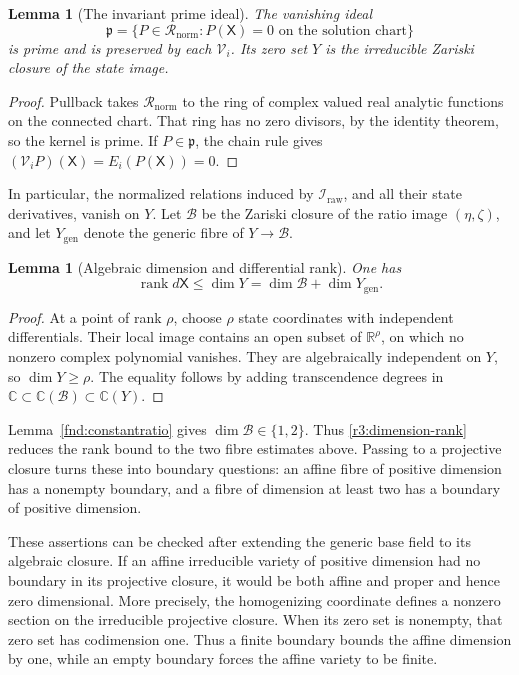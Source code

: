 \documentclass[11pt,a4paper]{article}
\numberwithin{equation}{section}
\theoremstyle{plain}
\newtheorem{lemma}[theorem]{Lemma}
\theoremstyle{definition}
\theoremstyle{remark}
\begin{document}
\begin{lemma}[The invariant prime ideal]\label{r3short:actual-prime}
The vanishing ideal
\[
 \mathfrak p=\{P\in\mathscr R_{\mathrm{norm}}:
       P(\mathsf X)=0\text{ on the solution chart}\}
\]
is prime and is preserved by each $\mathcal V_i$. Its zero set $Y$ is
the irreducible Zariski closure of the state image.
\end{lemma}
\begin{proof}
Pullback takes $\mathscr R_{\mathrm{norm}}$ to the ring of complex
valued real analytic functions on the connected chart. That ring has
no zero divisors, by the identity theorem, so the kernel is prime.
If $P\in\mathfrak p$, the chain rule gives
$(\mathcal V_iP)(\mathsf X)=E_i(P(\mathsf X))=0$.
\end{proof}

In particular, the normalized relations induced by
$\mathscr I_{\mathrm{raw}}$, and all their state derivatives, vanish
on $Y$. Let $\mathscr B$ be the Zariski closure of the ratio image
$(\eta,\zeta)$, and let $Y_{\mathrm{gen}}$ denote the generic fibre
of $Y\to\mathscr B$.

\begin{lemma}[Algebraic dimension and differential rank]
\label{r3short:rank}
One has
\begin{equation}\label{r3:dimension-rank}
 \operatorname{rank}d\mathsf X\le\dim Y
       =\dim\mathscr B+\dim Y_{\mathrm{gen}}.
\end{equation}
\end{lemma}
\begin{proof}
At a point of rank $\rho$, choose $\rho$ state coordinates with
independent differentials. Their local image contains an open subset
of $\mathbb R^\rho$, on which no nonzero complex polynomial vanishes.
They are algebraically independent on $Y$, so $\dim Y\ge\rho$.
The equality follows by adding transcendence degrees in
$\mathbb C\subset\mathbb C(\mathscr B)\subset\mathbb C(Y)$.
\end{proof}

Lemma~\ref{fnd:constantratio} gives $\dim\mathscr B\in\{1,2\}$.
Thus \eqref{r3:dimension-rank} reduces the rank bound to the two
fibre estimates above. Passing to a projective closure turns these
into boundary questions: an affine fibre of positive dimension has
a nonempty boundary, and a fibre of dimension at least two has a
boundary of positive dimension.

These assertions can be checked after extending the generic base
field to its algebraic closure. If an affine irreducible variety
of positive dimension had no boundary in its projective closure,
it would be both affine and proper and hence zero dimensional.
More precisely, the homogenizing coordinate defines a nonzero
section on the irreducible projective closure. When its zero set
is nonempty, that zero set has codimension one. Thus a finite
boundary bounds the affine dimension by one, while an empty
boundary forces the affine variety to be finite.
\end{document}
